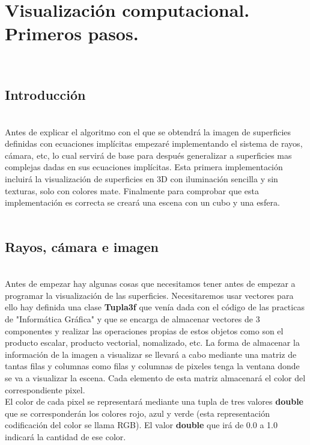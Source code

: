 \chapter{Visualización computacional. Primeros pasos.}

${ }$\\
\section{Introducción}
${ }$\\

Antes de explicar el algoritmo con el que se obtendrá la imagen de superficies definidas con ecuaciones implícitas empezaré implementando el sistema de rayos, cámara, etc, lo cual servirá de base para después generalizar a superficies mas complejas dadas en sus ecuaciones implícitas. Esta primera implementación incluirá la visualización de superficies en 3D con iluminación sencilla y sin texturas, solo con colores mate. Finalmente para comprobar que esta implementación es correcta se creará una escena con un cubo y una esfera.
${ }$\\

${ }$\\
\section{Rayos, cámara e imagen}
${ }$\\

Antes de empezar hay algunas cosas que necesitamos tener antes de empezar a programar la visualización de las superficies. Necesitaremos usar vectores para ello hay definida una clase \textbf{Tupla3f} que venía dada con el código de las practicas de "Informática Gráfica" y que se encarga de almacenar vectores de 3 componentes y realizar las operaciones propias de estos objetos como son el producto escalar, producto vectorial, nomalizado, etc. La forma de almacenar la información de la imagen a visualizar se llevará a cabo mediante una matriz de tantas filas y columnas como filas y columnas de pixeles tenga la ventana donde se va a visualizar la escena. Cada elemento de esta matriz almacenará el color del correspondiente pixel.
	${ }$\\	
	
El color de cada pixel se representará mediante una tupla de tres valores \textbf{double} que se corresponderán los colores rojo, azul y verde (esta representación codificación del color se llama RGB). El valor \textbf{double} que irá de 0.0 a 1.0 indicará la cantidad de ese color.
	${ }$\\	
	
